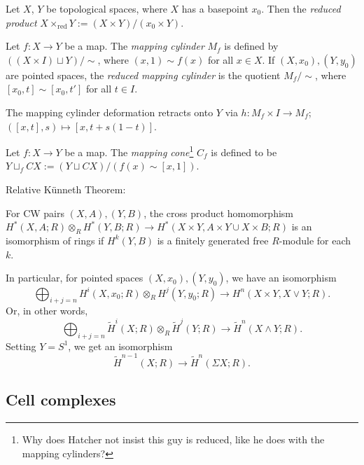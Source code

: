\documentclass{MetricNotes2023}
\begin{document}
\begin{definition}
Let \(X\), \(Y\) be topological spaces, where \(X\) has a basepoint \(x_0\). Then the \textit{reduced product} \(X\times_{\text{red}}Y:=(X\times Y)/(x_0 \times Y)\). 
\end{definition}

\begin{definition}
Let \(f : X \to Y\) be a map. The \textit{mapping cylinder} \(M_f\) is defined by \(((X\times I)\sqcup Y)/\sim\), where \((x,1)\sim f(x)\) for all \(x \in X\). If \((X, x_0), (Y, y_0)\) are pointed spaces, the \textit{reduced mapping cylinder} is the quotient \(M_f/\sim\), where \([x_0, t]\sim [x_0, t']\) for all \( t\in I\).
\end{definition}

\begin{remark}\label{2503231306}
The mapping cylinder deformation retracts onto \(Y\) via \(h : M_f \times I\to M_f\); \(([x,t], s)\mapsto [x, t+s(1-t)]\). 
\end{remark}

\begin{definition}
Let \(f : X \to Y\) be a map. The \textit{mapping cone}\footnote{Why does Hatcher not insist this guy is reduced, like he does with the mapping cylinders?} \(C_f\) is defined to be \(Y\sqcup_f CX:=(Y\sqcup CX)/(f(x)\sim [x,1])\). 
\end{definition}

Relative K\"{u}nneth Theorem:

\begin{theorem}
For CW pairs \((X, A), (Y, B)\), the cross product homomorphism \(H^*(X, A; R)\otimes_R H^*(Y,B; R)\to H^*(X\times Y, A\times Y \cup X\times B; R)\) is an isomorphism of rings if \(H^k(Y, B)\) is a finitely generated free \(R\)-module for each \(k\). 
\end{theorem}

In particular, for pointed spaces \((X, x_0), (Y, y_0)\), we have an isomorphism
\[\bigoplus_{i+j=n} H^i(X, x_0; R)\otimes_R H^j(Y,y_0; R)\to H^n(X\times Y, X\vee Y; R).\]
Or, in other words,
\[\bigoplus_{i+j=n} \widetilde H^i(X; R)\otimes_R \widetilde H^j(Y; R)\to \widetilde H^n(X\wedge Y; R).\]
Setting \(Y=S^1\), we get an isomorphism
\[\widetilde H^{n-1}(X; R) \to \widetilde H^n(\Sigma X; R).\]

\subsection{Cell complexes}\label{2502141508}
\end{document}
